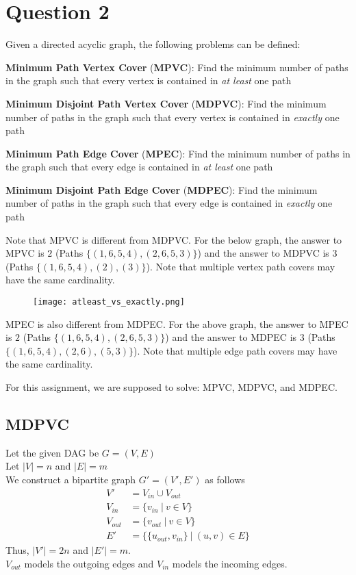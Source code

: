 \documentclass[11pt, fleqn]{article}
\begin{document}
\newpage 
\section*{Question 2}
\label{q2}
\setcounter{equation}{0}

Given a directed acyclic graph, the following problems can be defined:

\medskip
\textbf{Minimum Path Vertex Cover} (\textbf{MPVC}): Find the minimum number of paths in the graph such that every vertex is contained in \textit{at least} one path

\smallskip
\textbf{Minimum Disjoint Path Vertex Cover} (\textbf{MDPVC}): Find the minimum number of paths in the graph such that every vertex is contained in \textit{exactly} one path

\smallskip
\textbf{Minimum Path Edge Cover} (\textbf{MPEC}): Find the minimum number of paths in the graph such that every edge is contained in \textit{at least} one path

\smallskip
\textbf{Minimum Disjoint Path Edge Cover} (\textbf{MDPEC}): Find the minimum number of paths in the graph such that every edge is contained in \textit{exactly} one path

\medskip
Note that MPVC is different from MDPVC. For the below graph, the answer to MPVC is $2$ (Paths $\{(1, 6, 5, 4), (2, 6, 5, 3)\}$) and the answer to MDPVC is $3$ (Paths $\{(1, 6, 5, 4), (2), (3)\}$). Note that multiple vertex path covers may have the same cardinality.

\begin{figure}[H]
    \centering
    \texttt{[image: atleast\_vs\_exactly.png]}
    \label{fig:mpvc_vs_mdpvc}
\end{figure}

MPEC is also different from MDPEC. For the above graph, the answer to MPEC is $2$ (Paths $\{(1, 6, 5, 4), (2, 6, 5, 3)\}$) and the answer to MDPEC is $3$ (Paths $\{(1, 6, 5, 4), (2, 6), (5, 3)\}$). Note that multiple edge path covers may have the same cardinality.

\medskip
For this assignment, we are supposed to solve: MPVC, MDPVC, and MDPEC.


\newpage
\subsection*{MDPVC}

Let the given DAG be $G = (V, E)$\\
Let $|V| = n$ and $|E| = m$\\
We construct a bipartite graph $G' = (V', E')$ as follows
$$
    \begin{aligned}
        V' &= V_{in} \cup V_{out}\\
        V_{in} &= \{v_{in} \ | \ v \in V \}\\
        V_{out} &= \{v_{out} \ | \ v \in V \}\\
        E' &= \{\{u_{out}, v_{in}\} \ | \ (u, v) \in E\}
    \end{aligned}
$$
Thus, $|V'| = 2n$ and $|E'| = m$.\\
$V_{out}$ models the outgoing edges and $V_{in}$ models the incoming edges.
\end{document}
